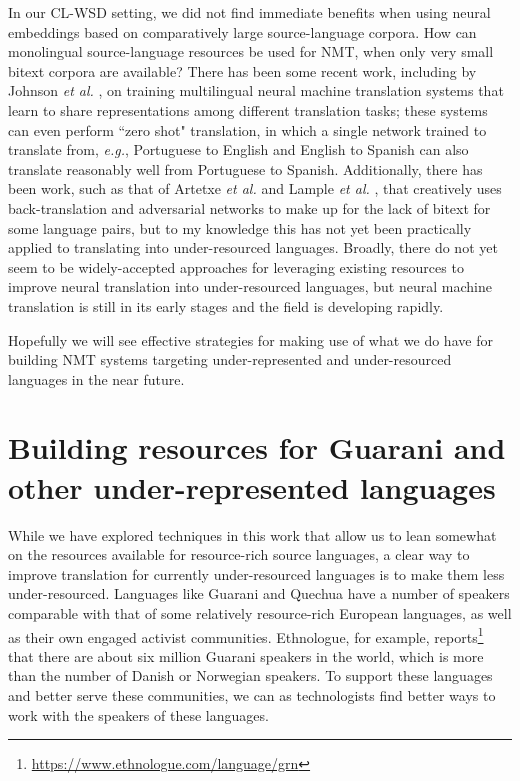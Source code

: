 In our CL-WSD setting, we did not find immediate benefits when using neural
embeddings based on comparatively large source-language corpora. How can
monolingual source-language resources be used for NMT, when only very small
bitext corpora are available?  There has been some recent work, including by
Johnson \emph{et al.} \cite{TACL1081}, on training multilingual neural machine
translation systems that learn to share representations among different
translation tasks; these systems can even perform ``zero shot" translation, in
which a single network trained to translate from, \emph{e.g.}, Portuguese to
English and English to Spanish can also translate reasonably well from
Portuguese to Spanish.
Additionally, there has been work, such as that of Artetxe \emph{et al.}
\cite{artetxe2018unsupervised} and Lample \emph{et al.}
\cite{lample2018unsupervised}, that creatively uses back-translation and
adversarial networks to make up for the lack of bitext for some language pairs,
but to my knowledge this has not yet been practically applied to translating
into under-resourced languages.  Broadly, there do not yet seem to be
widely-accepted approaches for leveraging existing resources to improve neural
translation into under-resourced languages, but neural machine translation is
still in its early stages and the field is developing rapidly.

Hopefully we will see effective strategies for making use of what we do have
for building NMT systems targeting under-represented and under-resourced
languages in the near future.

\section{Building resources for Guarani and other under-represented languages}
\label{sec:crowdsourcing}

While we have explored techniques in this work that allow us to lean
somewhat on the resources available for resource-rich source
languages, a clear way to improve translation for currently under-resourced
languages is to make them less under-resourced. Languages like Guarani and
Quechua have a number of speakers comparable with that of some relatively
resource-rich European languages, as well as their own engaged activist
communities. Ethnologue, for example,
reports\footnote{\url{https://www.ethnologue.com/language/grn}} that there are
about six million Guarani speakers in the world, which is more than the number
of Danish or Norwegian speakers. To support these languages and better serve
these communities, we can as technologists find better ways to work with the
speakers of these languages.

